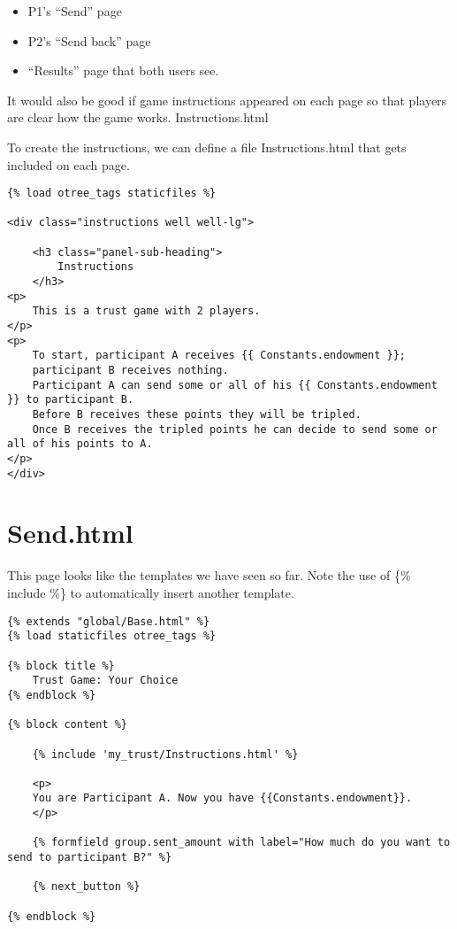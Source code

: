 \documentclass[11pt]{article}
\begin{document}
\begin{itemize}
\item P1’s “Send” page
\item P2’s “Send back” page
\item “Results” page that both users see.
\end{itemize}

It would also be good if game instructions appeared on each page so that players are clear how the game works.
Instructions.html

To create the instructions, we can define a file Instructions.html that gets included on each page.

\begin{verbatim}
{% load otree_tags staticfiles %}

<div class="instructions well well-lg">

    <h3 class="panel-sub-heading">
        Instructions
    </h3>
<p>
    This is a trust game with 2 players.
</p>
<p>
    To start, participant A receives {{ Constants.endowment }};
    participant B receives nothing.
    Participant A can send some or all of his {{ Constants.endowment }} to participant B.
    Before B receives these points they will be tripled.
    Once B receives the tripled points he can decide to send some or all of his points to A.
</p>
</div>
\end{verbatim}

\section{Send.html}
\label{sec:orgheadline5}

This page looks like the templates we have seen so far. Note the use of \{\% include \%\} to automatically insert another template.

\begin{verbatim}
{% extends "global/Base.html" %}
{% load staticfiles otree_tags %}

{% block title %}
    Trust Game: Your Choice
{% endblock %}

{% block content %}

    {% include 'my_trust/Instructions.html' %}

    <p>
    You are Participant A. Now you have {{Constants.endowment}}.
    </p>

    {% formfield group.sent_amount with label="How much do you want to send to participant B?" %}

    {% next_button %}

{% endblock %}
\end{verbatim}
\end{document}
